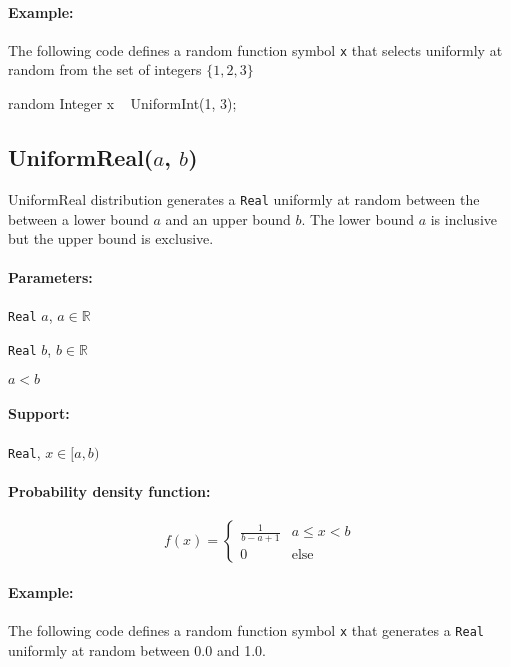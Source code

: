 \paragraph*{Example:}
The following code defines a random function symbol \verb|x| that selects uniformly at random from the set of integers $\{1, 2, 3\}$

\begin{blogcode}
random Integer x ~ UniformInt(1, 3);
\end{blogcode}

\subsection{UniformReal($a$, $b$)}

UniformReal distribution generates a \verb|Real| uniformly at random between the between a lower bound $a$ and an upper bound $b$. The lower bound $a$ is inclusive but the upper bound is exclusive.

\paragraph*{Parameters:} 
\begin{itemize*}
\item[] \verb|Real| $a$, $a \in \mathbb{R}$
\item[] \verb|Real| $b$, $b \in \mathbb{R}$
\item[] $a < b$
 
\end{itemize*}

\paragraph*{Support:} \verb|Real|, $x \in [a, b)$ 

\paragraph*{Probability density function:}
\[
	f(x) = \left\{
		  \begin{array}{lr}
		    \frac{1}{b - a + 1} & a \leq x < b \\
		    0 					& \text{else}
		  \end{array}
		\right.
\]

\paragraph*{Example:}
The following code defines a random function symbol \verb|x| that generates a \verb|Real| uniformly at random between 0.0 and 1.0.


